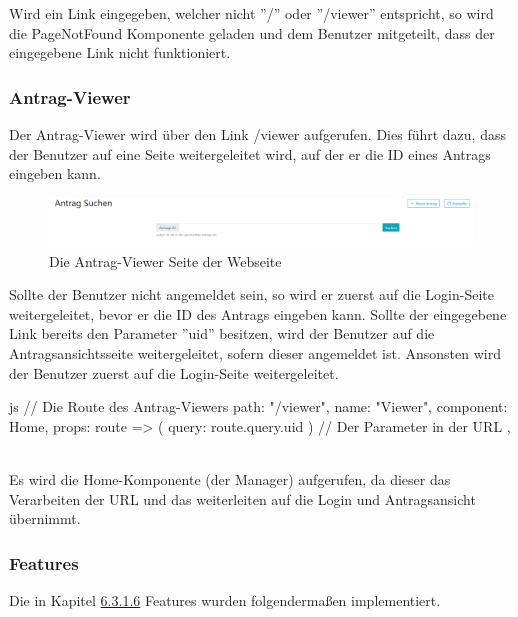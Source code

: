 Wird ein Link eingegeben, welcher nicht ''/'' oder ''/viewer'' entspricht, so wird die PageNotFound Komponente geladen und dem Benutzer mitgeteilt, dass der eingegebene Link nicht funktioniert.
\subsubsection{Antrag-Viewer}
\label{sec:antrag_viewer}
Der Antrag-Viewer wird über den Link /viewer aufgerufen. Dies führt dazu, dass der Benutzer auf eine Seite weitergeleitet wird, auf der er die ID eines Antrags eingeben kann.
\begin{figure}[H]
	\centering
	\includegraphics[width=1\linewidth]{images/antrag_viewer}
	\caption[Webseite Antrag-Viewer]{Die Antrag-Viewer Seite der Webseite}
	\label{fig:antragviewer}
\end{figure}

Sollte der Benutzer nicht angemeldet sein, so wird er zuerst auf die Login-Seite weitergeleitet, bevor er die ID des Antrags eingeben kann. Sollte der eingegebene Link bereits den Parameter ''uid'' besitzen, wird der Benutzer auf die Antragsansichtsseite weitergeleitet, sofern dieser angemeldet ist. Ansonsten wird der Benutzer zuerst auf die Login-Seite weitergeleitet.
\begin{code}{js}
	{
		// Die Route des Antrag-Viewers
		path: "/viewer",
		name: "Viewer",
		component: Home,
		props: route => ({ query: route.query.uid }) // Der Parameter in der URL
	},
\end{code}
~\\
Es wird die Home-Komponente (der Manager) aufgerufen, da dieser das Verarbeiten der URL und das weiterleiten auf die Login und Antragsansicht übernimmt.
\newpage
\subsubsection{Features}
Die in Kapitel \hyperref[sec:feature]{6.3.1.6} Features wurden folgendermaßen implementiert.


